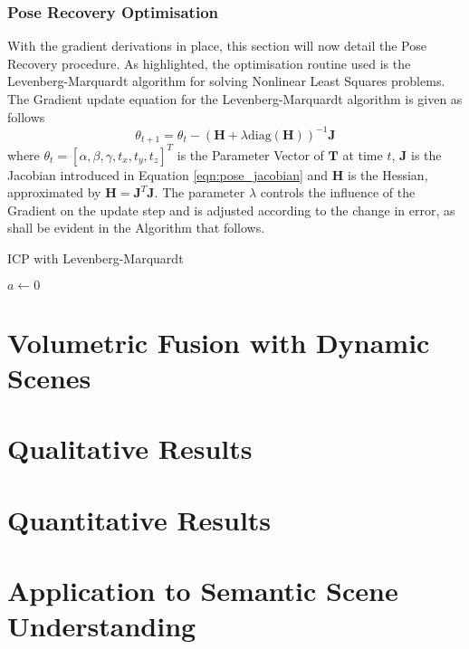 \subsubsection{Pose Recovery Optimisation}
\label{subsub:moseg_static_camera_poserec_opt}
With the gradient derivations in place, this section will now detail the
Pose Recovery procedure. As highlighted, the optimisation routine used is the
Levenberg-Marquardt\cite{NumericalRecipes} algorithm for solving Nonlinear Least
Squares problems. The Gradient update equation for the Levenberg-Marquardt
algorithm is given as follows
\begin{equation}
  \label{eqn:lm_update}
  \theta_{t+1} = \theta_{t} - (\mathbf{H} + \lambda \text{diag}(\mathbf{H}))^{-1}
  \mathbf{J}
\end{equation}
where $\theta_{t} = [\alpha, \beta, \gamma, t_{x}, t_{y}, t_{z}]^{T}$ is the
Parameter Vector of $\mathbf{T}$ at time $t$, $\mathbf{J}$ is the Jacobian
introduced in Equation \ref{eqn:pose_jacobian} and $\mathbf{H}$ is the Hessian,
approximated by $\mathbf{H} = \mathbf{J}^{T}\mathbf{J}$. The parameter $\lambda$
controls the influence of the Gradient on the update step and is adjusted
according to the change in error, as shall be evident in the Algorithm
that follows.

{\centering
  \begin{minipage}{.7\linewidth}
    \begin{algorithm}[H]
      \label{alg:icp}
      \caption{ICP with Levenberg-Marquardt}
      \begin{algorithmic}[1]
        \State $a \gets 0$
        \EndWhile
        \EndProcedure
      \end{algorithmic}
    \end{algorithm}
  \end{minipage}
  \par
}

\section{Volumetric Fusion with Dynamic Scenes}
\label{sec:moseg_dynamic_fusion}

\section{Qualitative Results}
\label{sec:moseg_qualitative}

\section{Quantitative Results}
\label{sec:moseg_quantitative}

\section{Application to Semantic Scene Understanding}
\label{sec:moseg_semantic}